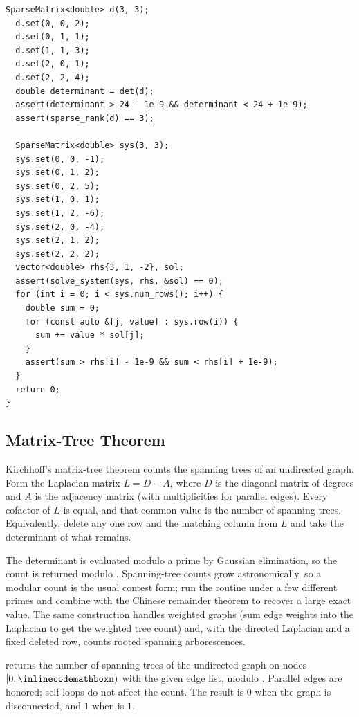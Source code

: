 \begin{lstlisting}[style=cpp]
  SparseMatrix<double> d(3, 3);
  d.set(0, 0, 2);
  d.set(0, 1, 1);
  d.set(1, 1, 3);
  d.set(2, 0, 1);
  d.set(2, 2, 4);
  double determinant = det(d);
  assert(determinant > 24 - 1e-9 && determinant < 24 + 1e-9);
  assert(sparse_rank(d) == 3);

  SparseMatrix<double> sys(3, 3);
  sys.set(0, 0, -1);
  sys.set(0, 1, 2);
  sys.set(0, 2, 5);
  sys.set(1, 0, 1);
  sys.set(1, 2, -6);
  sys.set(2, 0, -4);
  sys.set(2, 1, 2);
  sys.set(2, 2, 2);
  vector<double> rhs{3, 1, -2}, sol;
  assert(solve_system(sys, rhs, &sol) == 0);
  for (int i = 0; i < sys.num_rows(); i++) {
    double sum = 0;
    for (const auto &[j, value] : sys.row(i)) {
      sum += value * sol[j];
    }
    assert(sum > rhs[i] - 1e-9 && sum < rhs[i] + 1e-9);
  }
  return 0;
}
\end{lstlisting}
\subsection{Matrix-Tree Theorem}
\label{sec:6.5.9}
Kirchhoff's matrix-tree theorem counts the spanning trees of an undirected graph. Form the Laplacian matrix $L = D - A$, where $D$ is the diagonal matrix of degrees and $A$ is the adjacency matrix (with multiplicities for parallel edges). Every cofactor of $L$ is equal, and that common value is the number of spanning trees. Equivalently, delete any one row and the matching column from $L$ and take the determinant of what remains.

The determinant is evaluated modulo a prime by Gaussian elimination, so the count is returned modulo . Spanning-tree counts grow astronomically, so a modular count is the usual contest form; run the routine under a few different primes and combine with the Chinese remainder theorem to recover a large exact value. The same construction handles weighted graphs (sum edge weights into the Laplacian to get the weighted tree count) and, with the directed Laplacian and a fixed deleted row, counts rooted spanning arborescences.

\begin{compactitem}
  \item {} returns the number of spanning trees of the undirected graph on nodes $[0, {\inlinecodemath{n}})$ with the given edge list, modulo . Parallel edges are honored; self-loops do not affect the count. The result is $0$ when the graph is disconnected, and $1$ when  is $1$.
\end{compactitem}

